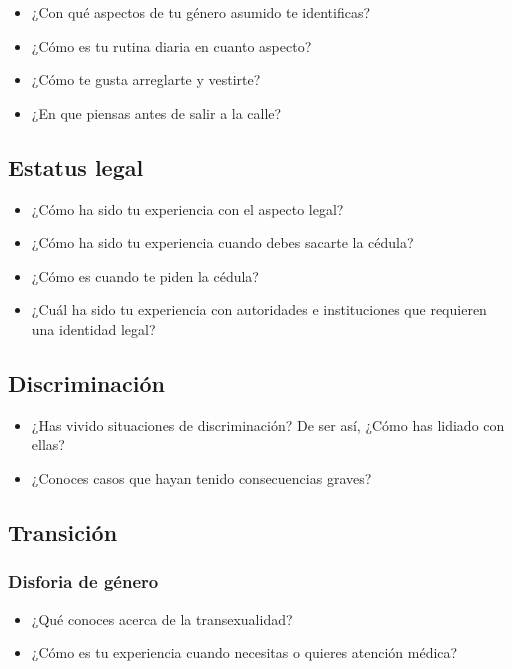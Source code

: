 \begin{itemize}
\item
  ¿Con qué aspectos de tu género asumido te identificas?
\item
  ¿Cómo es tu rutina diaria en cuanto aspecto?
\item
  ¿Cómo te gusta arreglarte y vestirte?
\item
  ¿En que piensas antes de salir a la calle?
\end{itemize}

\subsection{Estatus legal}

\begin{itemize}
\item
  ¿Cómo ha sido tu experiencia con el aspecto legal?
\item
  ¿Cómo ha sido tu experiencia cuando debes sacarte la cédula?
\item
  ¿Cómo es cuando te piden la cédula?
\item
  ¿Cuál ha sido tu experiencia con autoridades e instituciones que
  requieren una identidad legal?
\end{itemize}

\subsection{Discriminación}

\begin{itemize}
\item
  ¿Has vivido situaciones de discriminación? De ser así, ¿Cómo has
  lidiado con ellas?
\item
  ¿Conoces casos que hayan tenido consecuencias graves?
\end{itemize}

\subsection{Transición}
\subsubsection{Disforia de género}

\begin{itemize}
\item
  ¿Qué conoces acerca de la transexualidad?
\item
  ¿Cómo es tu experiencia cuando necesitas o quieres atención médica?
\end{itemize}

